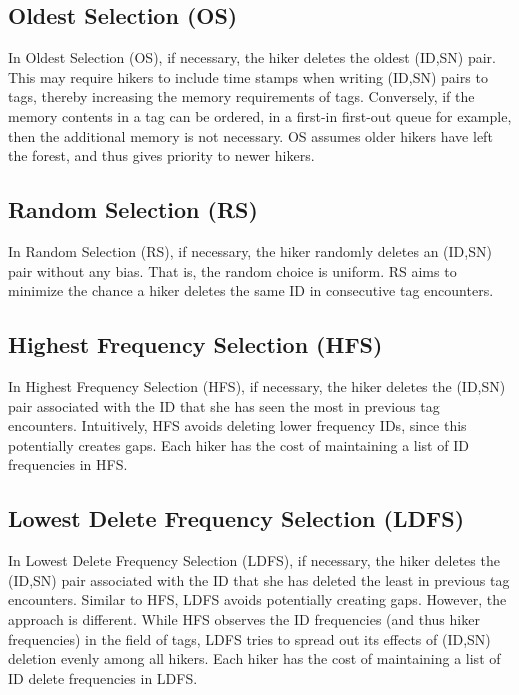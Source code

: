 \documentclass[conference]{IEEEtran}
\begin{document}
\subsection{Oldest Selection (OS)}
\label{sec:os}
In Oldest Selection (OS), if necessary, the hiker deletes the oldest (ID,SN) pair.  This may require hikers to include time stamps when writing (ID,SN) pairs to tags, thereby increasing the memory requirements of tags.  Conversely, if the memory contents in a tag can be ordered, in a first-in first-out queue for example, then the additional memory is not necessary.  OS assumes older hikers have left the forest, and thus gives priority to newer hikers.  

\subsection{Random Selection (RS)}
\label{sec:rs}
In Random Selection (RS), if necessary, the hiker randomly deletes an (ID,SN) pair without any bias.  That is, the random choice is uniform.  RS aims to minimize the chance a hiker deletes the same ID in consecutive tag encounters. 

\subsection{Highest Frequency Selection (HFS)}
\label{sec:hfs}
In Highest Frequency Selection (HFS), if necessary, the hiker deletes the (ID,SN) pair associated with the ID that she has seen the most in previous tag encounters.  Intuitively, HFS avoids deleting lower frequency IDs, since this potentially creates gaps.  Each hiker has the cost of maintaining a list of ID frequencies in HFS.

\subsection{Lowest Delete Frequency Selection (LDFS)}
\label{sec:ldfs}
In Lowest Delete Frequency Selection (LDFS), if necessary, the hiker deletes the (ID,SN) pair associated with the ID that she has deleted the least in previous tag encounters.  Similar to HFS, LDFS avoids potentially creating gaps.  However, the approach is different.  While HFS observes the ID frequencies (and thus hiker frequencies) in the field of tags, LDFS tries to spread out its effects of (ID,SN) deletion evenly among all hikers.  Each hiker has the cost of maintaining a list of ID delete frequencies in LDFS.
\end{document}
